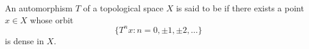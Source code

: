 An automorphism $T$ of a topological space $X$ is said to be  if there exists a point $x \in X$ whose orbit
$$\{T^n x : n = 0, \pm 1, \pm 2, \ldots\}$$
is dense in $X$.

